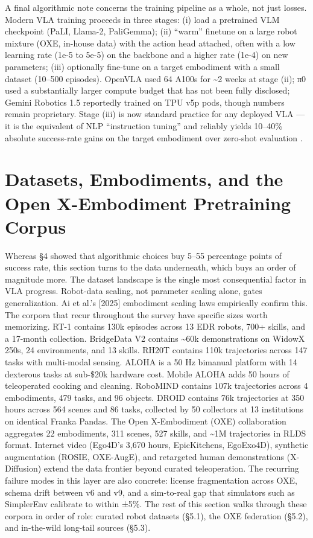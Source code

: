 \documentclass{article}
\begin{document}
A final algorithmic note concerns the training pipeline as a whole, not just losses. Modern VLA training proceeds in three stages: (i) load a pretrained VLM checkpoint (PaLI, Llama-2, PaliGemma); (ii) ``warm'' finetune on a large robot mixture (OXE, in-house data) with the action head attached, often with a low learning rate (1e-5 to 5e-5) on the backbone and a higher rate (1e-4) on new parameters; (iii) optionally fine-tune on a target embodiment with a small dataset (10--500 episodes). OpenVLA used 64 A100s for \textasciitilde2 weeks at stage (ii); π0 used a substantially larger compute budget that has not been fully disclosed; Gemini Robotics 1.5 reportedly trained on TPU v5p pods, though numbers remain proprietary. Stage (iii) is now standard practice for any deployed VLA --- it is the equivalent of NLP ``instruction tuning'' and reliably yields 10--40\% absolute success-rate gains on the target embodiment over zero-shot evaluation \cite{kim2024openvlaanopensourc,black20240avisionlanguageac,barreiros2026acarefulexaminatio}.

\section{Datasets, Embodiments, and the Open X-Embodiment Pretraining Corpus}\label{datasets-embodiments-and-the-open-x-embodiment-pretraining-corpus}

Whereas §4 showed that algorithmic choices buy 5--55 percentage points of success rate, this section turns to the data underneath, which buys an order of magnitude more. The dataset landscape is the single most consequential factor in VLA progress. Robot-data scaling, not parameter scaling alone, gates generalization. Ai et al.'s {[}2025{]} embodiment scaling laws empirically confirm this. The corpora that recur throughout the survey have specific sizes worth memorizing. RT-1 contains 130k episodes across 13 EDR robots, 700+ skills, and a 17-month collection. BridgeData V2 contains \textasciitilde60k demonstrations on WidowX 250s, 24 environments, and 13 skills. RH20T contains 110k trajectories across 147 tasks with multi-modal sensing. ALOHA is a 50 Hz bimanual platform with 14 dexterous tasks at sub-\$20k hardware cost. Mobile ALOHA adds 50 hours of teleoperated cooking and cleaning. RoboMIND contains 107k trajectories across 4 embodiments, 479 tasks, and 96 objects. DROID contains 76k trajectories at 350 hours across 564 scenes and 86 tasks, collected by 50 collectors at 13 institutions on identical Franka Pandas. The Open X-Embodiment (OXE) collaboration aggregates 22 embodiments, 311 scenes, 527 skills, and \textasciitilde1M trajectories in RLDS format. Internet video (Ego4D's 3,670 hours, EpicKitchens, EgoExo4D), synthetic augmentation (ROSIE, OXE-AugE), and retargeted human demonstrations (X-Diffusion) extend the data frontier beyond curated teleoperation. The recurring failure modes in this layer are also concrete: license fragmentation across OXE, schema drift between v6 and v9, and a sim-to-real gap that simulators such as SimplerEnv calibrate to within ±5\%. The rest of this section walks through these corpora in order of role: curated robot datasets (§5.1), the OXE federation (§5.2), and in-the-wild long-tail sources (§5.3).
\end{document}
